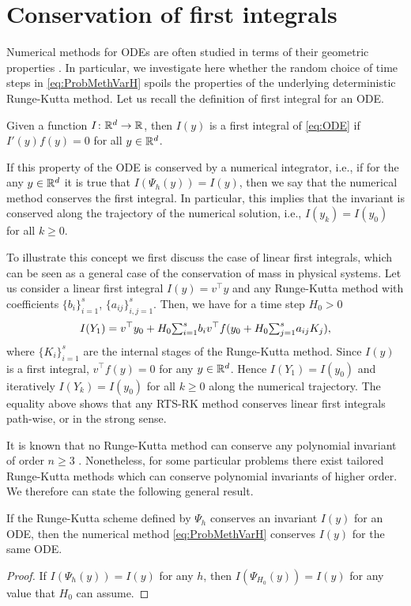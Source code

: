 \documentclass[final,onefignum,onetabnum]{siamonline171218}
\begin{document}
\section{Conservation of first integrals}\label{sec:GeomProperties}
Numerical methods for ODEs are often studied in terms of their geometric properties \cite{HLW06}. In particular, we investigate here whether the random choice of time steps in \eqref{eq:ProbMethVarH} spoils the properties of the underlying deterministic Runge-Kutta method. Let us recall the definition of first integral for an ODE.
\begin{definition} Given a function $I\colon\mathbb{R}^d\to\mathbb{R}$, then $I(y)$ is a first integral of \eqref{eq:ODE} if $I'(y)f(y) = 0$ for all $y \in \mathbb{R}^d$. 
\end{definition}	
If this property of the ODE is conserved by a numerical integrator, i.e., if for the any $y\in\mathbb{R}^d$ it is true that $I(\Psi_h(y)) = I(y)$, then we say that the numerical method conserves the first integral. In particular, this implies that the invariant is conserved along the trajectory of the numerical solution, i.e., $I(y_k) = I(y_0)$ for all $k\geq 0$.
	
\begin{example} To illustrate this concept we first discuss the case of linear first integrals, which can be seen as a general case of the conservation of mass in physical systems. Let us consider a linear first integral $I(y) = v^\top y$ and any Runge-Kutta method with coefficients $\{b_i\}_{i=1}^s$, $\{a_{ij}\}_{i,j=1}^s$. Then, we have for a time step $H_0 > 0$
	\begin{equation}
		I(Y_1) = v^\top y_0 + H_0 {\textstyle\sum}_{i=1}^s b_iv^\top f(y_0 + H_0{\textstyle\sum}_{j=1}^{s} a_{ij}K_j),
	\end{equation}
	where $\{K_i\}_{i=1}^s$ are the internal stages of the Runge-Kutta method. Since $I(y)$ is a first integral, $v^\top f(y) = 0$ for any $y \in \mathbb{R}^d$. Hence $I(Y_1)  = I(y_0)$ and iteratively $I(Y_k) = I(y_0)$ for all $k \geq 0$ along the numerical trajectory. The equality above shows that any RTS-RK method conserves linear first integrals path-wise, or in the strong sense. 
\end{example}

It is known that no Runge-Kutta method can conserve any polynomial invariant of order $n \geq 3$ \cite{HLW06}. Nonetheless, for some particular problems there exist tailored Runge-Kutta methods which can conserve polynomial invariants of higher order. We therefore can state the following general result.
\begin{theorem}\label{thm:PolyInvariants} If the Runge-Kutta scheme defined by $\Psi_h$ conserves an invariant $I(y)$ for an ODE, then the numerical method \eqref{eq:ProbMethVarH} conserves $I(y)$ for the same ODE.
\end{theorem}
\begin{proof} If $I(\Psi_h(y)) = I(y)$ for any $h$, then $I(\Psi_{H_0}(y)) = I(y)$ for any value that $H_0$ can assume.
\end{proof}
\end{document}
